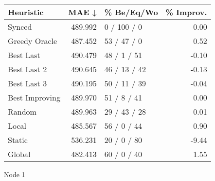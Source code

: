 \begin{tabular}{lrlr}
\toprule
\textbf{Heuristic} & \textbf{MAE ↓} & \textbf{\% Be/Eq/Wo} & \textbf{\% Improv.} \\
\midrule
            Synced &        489.992 &          0 / 100 / 0 &                0.00 \\
     Greedy Oracle &        487.452 &          53 / 47 / 0 &                0.52 \\
         Best Last &        490.479 &          48 / 1 / 51 &               -0.10 \\
       Best Last 2 &        490.645 &         46 / 13 / 42 &               -0.13 \\
       Best Last 3 &        490.195 &         50 / 11 / 39 &               -0.04 \\
    Best Improving &        489.970 &          51 / 8 / 41 &                0.00 \\
            Random &        489.963 &         29 / 43 / 28 &                0.01 \\
             Local &        485.567 &          56 / 0 / 44 &                0.90 \\
            Static &        536.231 &          20 / 0 / 80 &               -9.44 \\
            Global &        482.413 &          60 / 0 / 40 &                1.55 \\
\bottomrule
\end{tabular}
\caption{Node 1}
\label{tab:iid_lr05_le1_bs4_1}
